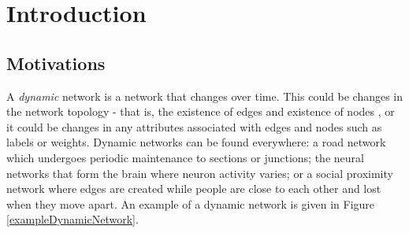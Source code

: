 
\chapter{Introduction}
\label{chap:introduction}
\ifpdf
    \graphicspath{{Introduction/Figures/PNG/}{Introduction/Figures/PDF/}{Introduction/Figures/}}
\else
    \graphicspath{{Introduction/Figures/EPS/}{Introduction/Figures/}}
\fi




\section{Motivations}
\label{motivations}
A \textit{dynamic} network is a network that changes over time. This could be changes in the network topology - that is, the existence of edges and existence of nodes \cite{itdn}, or it could be changes in any attributes associated with edges and nodes such as labels or weights. Dynamic networks can be found everywhere: a road network which undergoes periodic maintenance to sections or junctions; the neural networks that form the brain where neuron activity varies; or a social proximity network where edges are created while people are close to each other and lost when they move apart. An example of a dynamic network is given in Figure \ref{exampleDynamicNetwork}.

